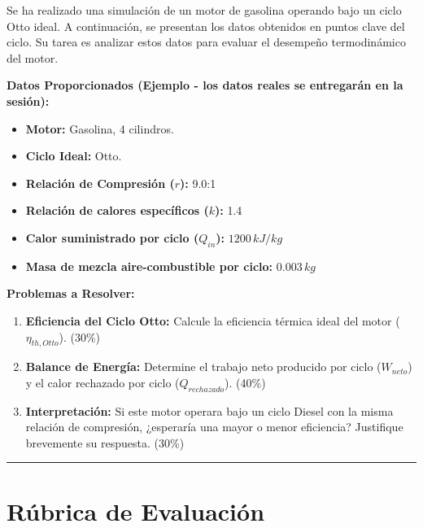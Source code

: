 \documentclass{article}
\begin{document}
Se ha realizado una simulación de un motor de gasolina operando bajo un ciclo Otto ideal. A continuación, se presentan los datos obtenidos en puntos clave del ciclo. Su tarea es analizar estos datos para evaluar el desempeño termodinámico del motor.

\textbf{Datos Proporcionados (Ejemplo - los datos reales se entregarán en la sesión):}

\begin{itemize}
    \item \textbf{Motor:} Gasolina, 4 cilindros.
    \item \textbf{Ciclo Ideal:} Otto.
    \item \textbf{Relación de Compresión ($r$):} 9.0:1
    \item \textbf{Relación de calores específicos ($k$):} 1.4
    \item \textbf{Calor suministrado por ciclo ($Q_{in}$):} $1200 \, kJ/kg$
    \item \textbf{Masa de mezcla aire-combustible por ciclo:} $0.003 \, kg$
\end{itemize}

\textbf{Problemas a Resolver:}

\begin{enumerate}
    \item \textbf{Eficiencia del Ciclo Otto:} Calcule la eficiencia térmica ideal del motor ($\eta_{th,Otto}$). (30\%)
    \item \textbf{Balance de Energía:} Determine el trabajo neto producido por ciclo ($W_{neto}$) y el calor rechazado por ciclo ($Q_{rechazado}$). (40\%)
    \item \textbf{Interpretación:} Si este motor operara bajo un ciclo Diesel con la misma relación de compresión, ¿esperaría una mayor o menor eficiencia? Justifique brevemente su respuesta. (30\%)
\end{enumerate}

\vspace{5mm}
\hrule
\vspace{5mm}

\section*{Rúbrica de Evaluación}
\end{document}
